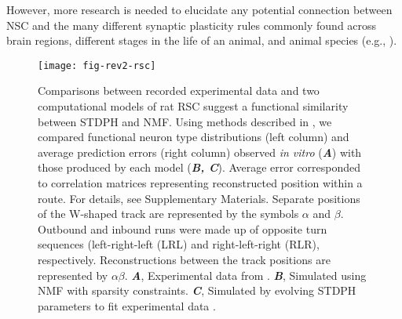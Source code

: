However, more research is needed to elucidate any potential connection 
between \ac{NSC} and the many different synaptic plasticity rules 
commonly found across brain regions,
different stages in the life of an animal, and animal species
(e.g., \cite{Froemke2010,BCM1982}).
\begin{figure}[h]
	\centering
	\texttt{[image: fig-rev2-rsc]}
    \caption{
    	Comparisons between recorded experimental data and two 
        computational models of rat \ac{RSC} suggest a functional 
        similarity between \ac{STDPH} and \ac{NMF}.
        Using methods described in \cite{AlexanderNitz2015}, 
        we compared functional neuron type distributions (left column)
        and average  prediction errors (right column)
        observed \emph{in vitro} (\textbf{\emph{A}}) with those
        produced by each model (\textbf{\emph{B, C}}).
        Average error corresponded to correlation matrices 
        representing reconstructed position within a route. 
        For details, see Supplementary Materials.
        Separate positions of the W-shaped track are represented 
        by the symbols $\alpha$ and $\beta$. 
        Outbound and inbound runs were made up of 
        opposite turn sequences (left-right-left (LRL) 
        and right-left-right (RLR), respectively.
        Reconstructions between the track positions are represented by
        $\alpha \beta$.
	    \textbf{\emph{A}},
    		Experimental data from \cite{AlexanderNitz2015}.
        \textbf{\emph{B}},
            Simulated using NMF with sparsity constraints.
        \textbf{\emph{C}},
            Simulated by evolving \ac{STDPH} parameters 
            to fit experimental data \cite{BeyelerCarlsonChou2015,Carlson2014}.
    }
	\label{fig:NMF|RSC}
\end{figure} 



\subsection*{}


